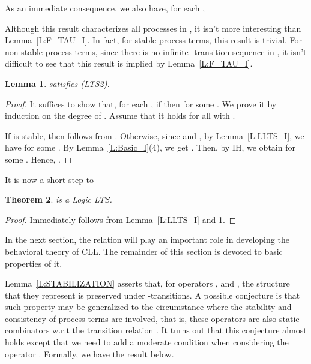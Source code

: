 \documentclass{elsarticle}
\theoremstyle{plain}
\newtheorem{theorem}{Theorem}[section]
\newtheorem{lemma}[theorem]{Lemma}
\theoremstyle{definition}
\begin{document}
As an immediate consequence, we also have, for each ,

Although this result characterizes all processes in , it isn't more interesting than Lemma~\ref{L:F_TAU_I}.
In fact, for stable process terms, this result is trivial.
For non-stable process terms, since there is no infinite -transition sequence in , it isn't difficult to see that this result is implied by Lemma~\ref{L:F_TAU_I}.

\begin{lemma}\label{L:LLTS_II}
     satisfies (LTS2).
\end{lemma}
\begin{proof}
    It suffices to show that, for each , if  then  for some .
   We prove it by induction on the degree of .
   Assume that it holds for all  with .

   If  is stable, then  follows from .
   Otherwise, since  and , by Lemma~\ref{L:LLTS_I}, we have  for some .
   By Lemma~\ref{L:Basic_I}(4), we get . Then, by IH, we obtain   for some . Hence, .
\end{proof}

It is now a short step to

\begin{theorem}\label{L:LLTS}
     is a Logic LTS.
\end{theorem}
\begin{proof}
    Immediately follows from Lemma~\ref{L:LLTS_I} and \ref{L:LLTS_II}.
\end{proof}

In the next section, the relation  will play an important role in developing the behavioral theory of CLL. The remainder of this section is devoted to basic properties of it.

Lemma~\ref{L:STABILIZATION} asserts that, for operators ,  and , the structure that they represent is preserved under -transitions.
A possible conjecture is that such property may be generalized to the circumstance where the stability and consistency of process terms are involved, that is, these operators are also static combinators w.r.t the transition relation  .
It turns out that this conjecture almost holds except that we need to add a moderate condition when considering the operator . Formally, we have the result below.
\end{document}
